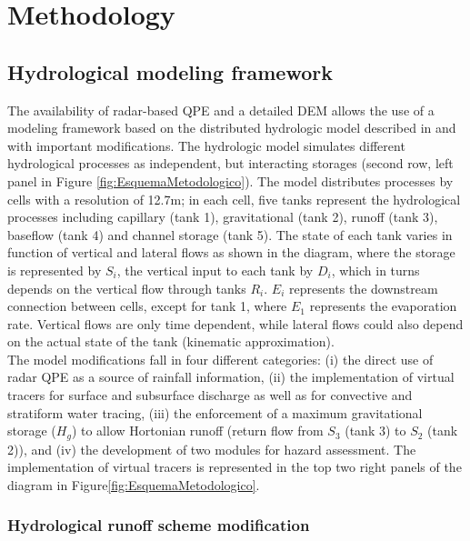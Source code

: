\documentclass[hess, manuscript]{copernicus}
\begin{document}
\section{Methodology}
\label{sec:methods}

\subsection{Hydrological modeling framework}

The availability of radar-based QPE and a detailed DEM allows the use of a modeling framework based on the distributed hydrologic model described in \citet{Velez2001} and \citet{Frances2007b} with important modifications. The hydrologic model simulates different hydrological processes as independent, but interacting storages (second row, left panel in Figure \ref{fig:EsquemaMetodologico}).  The model distributes processes by cells with a resolution of 12.7m; in each cell, five tanks represent the hydrological processes including capillary (tank 1), gravitational (tank 2), runoff (tank 3), baseflow (tank 4) and channel storage (tank 5).  The state of each tank varies in function of vertical and lateral flows as shown in the diagram, where the storage is represented by $S_i$, the vertical input to each tank by $D_i$, which in turns depends on the vertical flow through tanks $R_i$. $E_i$ represents the downstream connection between cells, except for tank 1, where $E_1$ represents the evaporation rate. Vertical flows are only time dependent, while lateral flows could also depend on the actual state of the tank (kinematic approximation).\\

The model modifications fall in four different categories: (i) the direct use of radar QPE as a source of rainfall information, (ii) the implementation of virtual tracers for surface and subsurface discharge  as well as for convective and stratiform water tracing,  (iii)  the enforcement of a maximum gravitational storage ($H_{g}$) to allow Hortonian runoff (return flow from $S_3$ (tank 3) to $S_2$ (tank 2)), and (iv)  the development of two modules for hazard assessment. The implementation of virtual tracers is represented in the top two right panels of the diagram in Figure\ref{fig:EsquemaMetodologico}.\\

\subsubsection{Hydrological runoff scheme modification}
\end{document}
